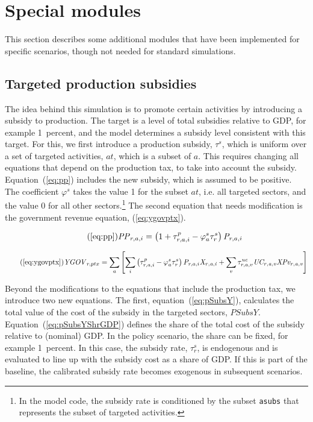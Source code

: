 \documentclass[11pt,letterpaper]{report}
\begin{document}
\section{Special modules}
\renewcommand{\theequation}{{Z-}\arabic{equation}}
\setcounter{equation}{0}
\label{sec:SpcMod}

This section describes some additional modules that have been
implemented for specific scenarios, though not needed for
standard simulations.

\subsection{Targeted production subsidies}

The idea behind this simulation is to promote certain activities
by introducing a subsidy to production. The target is a level
of total subsidies relative to GDP, for example 1~percent, and
the model determines a subsidy level consistent with this target.
For this, we first introduce a production subsidy, $\tau^s$, which
is uniform over a set of targeted activities, $\mathit{at}$, which
is a subset of $a$. This requires changing all equations that
depend on the production tax, to take into account the subsidy.
Equation~(\ref{eq:pp}) includes the new subsidy, which is assumed
to be positive. The coefficient $\varphi^s$ takes the value
1 for the subset $\mathit{at}$, i.e. all targeted sectors, and
the value 0 for all other sectors.\footnote{In the model
code, the subsidy rate is conditioned by the subset \texttt{asubs}
that represents the subset of targeted activities.}
The second equation that needs modification is the government
revenue equation, (\ref{eq:ygovptx}).

\begin{equation}
\label{eq:ppp}
\tag{\ref{eq:pp}}
\mathit{PP}_{r,a,i} =
   \left( 1 + \tau^p_{r,a,i} - \varphi^s_{a} \tau^s_{r} \right) \mathit{P}_{r,a,i}
\end{equation}

\begin{equation}
\label{eq:ygovptxp}
\tag{\ref{eq:ygovptx}}
\mathit{YGOV}_{r,ptx} =
   \sum_a{
      \left[
         \sum_i{
            \left( \tau^p_{r,a,i} - \varphi^s_{a} \tau^s_{r} \right) \mathit{P}_{r,a,i} \mathit{X_{r,a,i}}
         }
      +  \sum_v{
            \tau^\mathit{uc}_{r,a,v} \mathit{UC_{r,a,v}} \mathit{XPv_{r,a,v}}
         }
      \right]
   }
\end{equation}

Beyond the modifications to the equations that include the
production tax, we introduce two new equations.
The first, equation~(\ref{eq:pSubsY}), calculates the total
value of the cost of the subsidy in the targeted sectors, $\mathit{PSubsY}$.
Equation~(\ref{eq:pSubsYShrGDP}) defines the share of the total
cost of the subsidy relative to (nominal) GDP. In the policy
scenario, the share can be fixed, for example 1~percent. In this
case, the subsidy rate, $\tau^s_{r}$, is endogenous and is
evaluated to line
up with the subsidy cost as a share of GDP. If this is part of the
baseline, the calibrated subsidy rate becomes exogenous in
subsequent scenarios.
\end{document}
